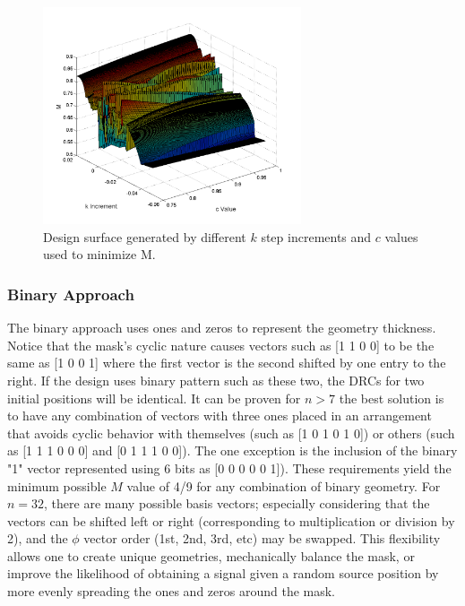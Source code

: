 \documentclass[3p,times]{elsarticle}
\begin{document}
\begin{figure}[ht!]
\includegraphics[width={3.0in}]{../figs/Eigprob32bitCouple2W1.pdf}
\centering
\caption{Design surface generated by different $k$ step increments and $c$ values used to minimize M.}
\label{fig:surf}
\end{figure}

\subsubsection{Binary Approach}
The binary approach uses ones and zeros to represent the geometry thickness.  
Notice that the mask's cyclic nature causes vectors such as [1 1 0 0] to be the same as [1 0 0 1] where the first vector is the second shifted by one entry to the right.  
If the design uses binary pattern such as these two, the DRCs for two initial positions will be identical.  
It can be proven for $n>7$ the best solution is to have any combination of vectors with three ones placed in an arrangement that avoids cyclic behavior with themselves (such as [1 0 1 0 1 0]) or others (such as [1 1 1 0 0 0] and [0 1 1 1 0 0]).  
The one exception is the inclusion of the binary "1" vector represented using 6 bits as [0 0 0 0 0 1]).  
These requirements yield the minimum possible $M$ value of 4/9 for any combination of binary geometry.  
For $n=32$, there are many possible basis vectors; especially considering that the vectors can be shifted left or right (corresponding to multiplication or division by 2), and the $\phi$ vector order (1st, 2nd, 3rd, etc) may be swapped.  
This flexibility allows one to create unique geometries, mechanically balance the mask, or improve the likelihood of obtaining a signal given a random source position by more evenly spreading the ones and zeros around the mask.
\end{document}
